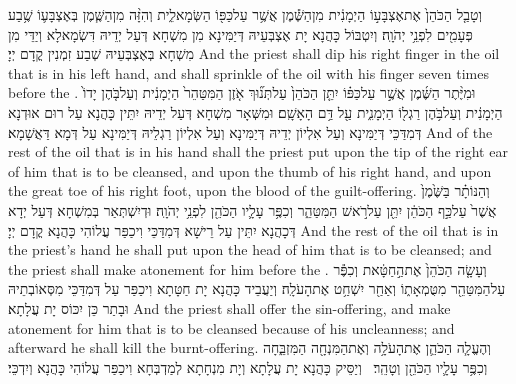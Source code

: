 {וְטָבַ֤ל הַכֹּהֵן֙ אֶת\maqqaf אֶצְבָּע֣וֹ הַיְמָנִ֔ית מִן\maqqaf הַשֶּׁ֕מֶן אֲשֶׁ֥ר עַל\maqqaf כַּפּ֖וֹ הַשְּׂמָאלִ֑ית וְהִזָּ֨ה מִן\maqqaf הַשֶּׁ֧מֶן בְּאֶצְבָּע֛וֹ שֶׁ֥בַע פְּעָמִ֖ים לִפְנֵ֥י יְהֹוָֽה׃}
{וְיִטְבּוֹל כָּהֲנָא יָת אֶצְבְּעֵיהּ דְּיַמִּינָא מִן מִשְׁחָא דְּעַל יְדֵיהּ דִּשְׂמָאלָא וְיַדֵּי מִן מִשְׁחָא בְּאֶצְבְּעֵיהּ שְׁבַע זִמְנִין קֳדָם יְיָ׃}
{And the priest shall dip his right finger in the oil that is in his left hand, and shall sprinkle of the oil with his finger seven times before the \lord.}{}
{וּמִיֶּ֨תֶר הַשֶּׁ֜מֶן אֲשֶׁ֣ר עַל\maqqaf כַּפּ֗וֹ יִתֵּ֤ן הַכֹּהֵן֙ עַל\maqqaf תְּנ֞וּךְ אֹ֤זֶן הַמִּטַּהֵר֙ הַיְמָנִ֔ית וְעַל\maqqaf בֹּ֤הֶן יָדוֹ֙ הַיְמָנִ֔ית וְעַל\maqqaf בֹּ֥הֶן רַגְל֖וֹ הַיְמָנִ֑ית עַ֖ל דַּ֥ם הָאָשָֽׁם׃}
{וּמִשְּׁאָר מִשְׁחָא דְּעַל יְדֵיהּ יִתֵּין כָּהֲנָא עַל רוּם אוּדְנָא דְּמִדַּכֵּי דְּיַמִּינָא וְעַל אִלְיוֹן יְדֵיהּ דְּיַמִּינָא וְעַל אִלְיוֹן רַגְלֵיהּ דְּיַמִּינָא עַל דְּמָא דַּאֲשָׁמָא׃}
{And of the rest of the oil that is in his hand shall the priest put upon the tip of the right ear of him that is to be cleansed, and upon the thumb of his right hand, and upon the great toe of his right foot, upon the blood of the guilt-offering.}{}
{וְהַנּוֹתָ֗ר בַּשֶּׁ֙מֶן֙ אֲשֶׁר֙ עַל\maqqaf כַּ֣ף הַכֹּהֵ֔ן יִתֵּ֖ן עַל\maqqaf רֹ֣אשׁ הַמִּטַּהֵ֑ר וְכִפֶּ֥ר עָלָ֛יו הַכֹּהֵ֖ן לִפְנֵ֥י יְהֹוָֽה׃}
{וּדְיִשְׁתְּאַר בְּמִשְׁחָא דְּעַל יְדָא דְּכָהֲנָא יִתֵּין עַל רֵישָׁא דְּמִדַּכֵּי וִיכַפַּר עֲלוֹהִי כָּהֲנָא קֳדָם יְיָ׃}
{And the rest of the oil that is in the priest’s hand he shall put upon the head of him that is to be cleansed; and the priest shall make atonement for him before the \lord.}{}
{וְעָשָׂ֤ה הַכֹּהֵן֙ אֶת\maqqaf הַ֣חַטָּ֔את וְכִפֶּ֕ר עַל\maqqaf הַמִּטַּהֵ֖ר מִטֻּמְאָת֑וֹ וְאַחַ֖ר יִשְׁחַ֥ט אֶת\maqqaf הָעֹלָֽה׃}
{וְיַעֲבֵיד כָּהֲנָא יָת חַטָּתָא וִיכַפַּר עַל דְּמִדַּכֵּי מִסְּאוֹבְתֵיהּ וּבָתַר כֵּן יִכּוֹס יָת עֲלָתָא׃}
{And the priest shall offer the sin-offering, and make atonement for him that is to be cleansed because of his uncleanness; and afterward he shall kill the burnt-offering.}{}
{וְהֶעֱלָ֧ה הַכֹּהֵ֛ן אֶת\maqqaf הָעֹלָ֥ה וְאֶת\maqqaf הַמִּנְחָ֖ה הַמִּזְבֵּ֑חָה וְכִפֶּ֥ר עָלָ֛יו הַכֹּהֵ֖ן וְטָהֵֽר׃ \setuma }
{וְיַסֵּיק כָּהֲנָא יָת עֲלָתָא וְיָת מִנְחָתָא לְמַדְבְּחָא וִיכַפַּר עֲלוֹהִי כָּהֲנָא וְיִדְכֵּי׃}
